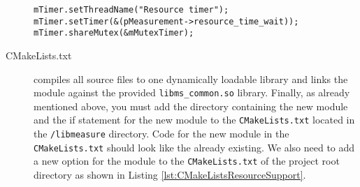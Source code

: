 \begin{description}
\begin{lstlisting}[caption={\texttt{CMeasureResourceThread} constructor template.},label=lst:CMeasureResourceThreadConstructor]
mTimer.setThreadName("Resource timer");
mTimer.setTimer(&(pMeasurement->resource_time_wait));
mTimer.shareMutex(&mMutexTimer);
\end{lstlisting}
	
	\item[CMakeLists.txt] compiles all source files to one dynamically loadable library and links the module against the provided \texttt{libms\_common.so} library. Finally, as already mentioned above, you must add the directory containing the new module and the if statement for the new module to the \texttt{CMakeLists.txt} located in the \texttt{/libmeasure} directory. Code for the new module in the \texttt{CMakeLists.txt} should look like the already existing. We also need to add a new option for the module to the \texttt{CMakeLists.txt} of the project root directory as shown in Listing \ref{lst:CMakeListsResourceSupport}.
\end{description}

